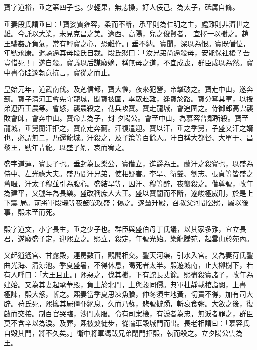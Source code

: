 \begin{pinyinscope}
 寶字道裕，垂之第四子也。少輕果，無志操，好人佞己。為太子，砥厲自脩。



 垂妻段氏謂垂曰：「寶姿質雍容，柔而不斷，承平則為仁明之主，處難則非濟世之雄。今託以大業，未見克昌之美。遼西、高陽，兒之俊賢者，
 宜擇一以樹之。趙王驎姦詐負氣，常有輕寶之心，恐難作。」垂不納。寶聞，深以為恨。寶既僭位，年號永康。遣驎逼其母段氏自裁。段氏怒曰：「汝兄弟尚逼殺母，安能保社稷？吾豈惜死！」遂自殺。寶議以后謀廢嫡，稱無母之道，不宜成喪，群臣咸以為然。寶中書令眭邃執意抗言，寶從之而止。



 皇始元年，道武南伐。及剋信都，寶大懼，夜來犯營，帝擊破之。寶走中山，遂奔薊。寶子清河王會先守龍城，聞寶被圍，率眾赴難，逢寶於路。寶分奪其軍，以授弟遼西王農等。會怒，襲農殺之，勒兵攻寶。寶走龍城，會追圍之。侍御郎高雲襲敗會師，會奔中山。寶命雲為子，封
 夕陽公。會至中山，為慕容普鄰所殺。寶至龍城，垂舅蘭汗拒之，寶南走奔薊。汗復遣迎。寶以汗，垂之季舅，子盛又汗之婿也，必謂無二，乃還龍城。汗殺之，及子策等百餘人。汗自稱大都督、大單于、昌黎王，號年青龍。以盛子婿，哀而宥之。



 盛字道運，寶長子也。垂封為長樂公，寶僭立，進爵為王。蘭汗之殺寶也，以盛為侍中、左光祿大夫。盛乃間汗兄弟，使相疑害。李旱、衛雙、劉志、張貞等皆盛之舊暱，汗太子穆並引為腹心。盛結旱等，因汗、穆等醉，夜襲殺之。僭尊號，改年為建平，又號年為長樂。盛改稱庶人大王。盛以寶闇而不斷，遂峻極威刑，於是上下震
 局。前將軍段璣等夜鼓噪攻盛；傷之。遂輦升殿，召叔父河間公熙，屬以後事，熙未至而死。



 熙字道文，小字長生，垂之少子也。群臣與盛伯母丁氏議，以其家多難，宜立長君，遂廢盛子定，迎熙立之。熙立，殺定，年號光始。築龍騰苑，起雲山於苑內。



 又起逍遙宮、甘露殿，連房數百，觀閣相交。鑿天河渠，引水入宮。又為妻苻氏鑿曲光海、清涼池。季夏盛暑，不得休息，暍死者太半。熙遊城南，止大柳樹下，若有人呼曰：「大王且止。」熙惡之，伐其樹，下有蛇長丈餘。熙盡殺寶諸子，改年為建始。又為其妻起承華殿，負土於北門，土與穀同價。典軍杜靜載棺詣闕，上書
 極諫，熙大怒，斬之。熙妻當季夏思凍魚膾，仲冬須生地黃，切責不得，加有司大辟。苻氏死，熙擁其屍僵仆絕息，久而乃蘇，悲號擗踴，斬衰食粥。大斂之後，復啟而交接。制百官哭臨，沙門素服。令有司案檢，有淚者為忠，無淚者罪之，群臣莫不含辛以為淚。及葬，熙被髮徒步，從轜車毀城門而出。長老相謂曰：「慕容氏自毀其門，將不久矣。」衛中將軍馮跋兄弟閉門拒熙，執而殺之。立夕陽公雲為王。




\end{pinyinscope}
